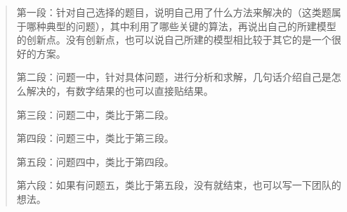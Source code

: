  \begin{abstract}
第一段：针对自己选择的题目，说明自己用了什么方法来解决的（这类题属于哪种典型的问题），其中利用了哪些关键的算法，再说出自己的所建模型的创新点。没有创新点，也可以说自己所建的模型相比较于其它的是一个很好的方案。

第二段：问题一中，针对具体问题，进行分析和求解，几句话介绍自己是怎么解决的，有数字结果的也可以直接贴结果。

第三段：问题二中，类比于第二段。

第四段：问题三中，类比于第三段。

第五段：问题四中，类比于第四段。

第六段：如果有问题五，类比于第五段，没有就结束，也可以写一下团队的想法。






\end{abstract}
